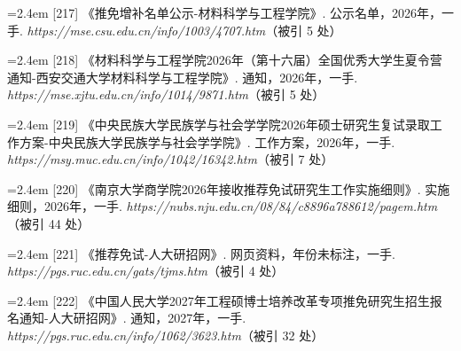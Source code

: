 {\vspace{0.6pt}
\noindent\hangindent=2.4em \label{src:S0275}{\color{cAccent}[217]} 《推免增补名单公示-材料科学与工程学院》. 公示名单，2026年，一手. \textit{https://mse.csu.edu.cn/info/1003/4707.htm}（被引 5 处）\par
\vspace{0.6pt}
\vspace{3.5pt}\par
\nopagebreak\vspace{1pt}
\noindent\hangindent=2.4em \label{src:S0278}{\color{cAccent}[218]} 《材料科学与工程学院2026年（第十六届）全国优秀大学生夏令营通知-西安交通大学材料科学与工程学院》. 通知，2026年，一手. \textit{https://mse.xjtu.edu.cn/info/1014/9871.htm}（被引 5 处）\par
\vspace{0.6pt}
\vspace{3.5pt}\par
\nopagebreak\vspace{1pt}
\noindent\hangindent=2.4em \label{src:S0279}{\color{cAccent}[219]} 《中央民族大学民族学与社会学学院2026年硕士研究生复试录取工作方案-中央民族大学民族学与社会学学院》. 工作方案，2026年，一手. \textit{https://msy.muc.edu.cn/info/1042/16342.htm}（被引 7 处）\par
\vspace{0.6pt}
\vspace{3.5pt}\par
\nopagebreak\vspace{1pt}
\noindent\hangindent=2.4em \label{src:S0282}{\color{cAccent}[220]} 《南京大学商学院2026年接收推荐免试研究生工作实施细则》. 实施细则，2026年，一手. \textit{https://nubs.nju.edu.cn/08/84/c8896a788612/pagem.htm}（被引 44 处）\par
\vspace{0.6pt}
\vspace{3.5pt}\par
\nopagebreak\vspace{1pt}
\noindent\hangindent=2.4em \label{src:S0285}{\color{cAccent}[221]} 《推荐免试-人大研招网》. 网页资料，年份未标注，一手. \textit{https://pgs.ruc.edu.cn/gats/tjms.htm}（被引 4 处）\par
\vspace{0.6pt}
\noindent\hangindent=2.4em \label{src:S0286}{\color{cAccent}[222]} 《中国人民大学2027年工程硕博士培养改革专项推免研究生招生报名通知-人大研招网》. 通知，2027年，一手. \textit{https://pgs.ruc.edu.cn/info/1062/3623.htm}（被引 32 处）\par
}
